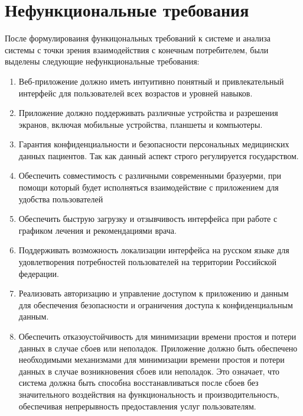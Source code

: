 \documentclass[14pt]{extreport}
\begin{document}
    \section{Нефункциональные требования}

        После формулироваиня функицональных требований к системе и анализа %
        системы с точки зрения взаимодействия с конечным потребителем, были выделены %
        следующие нефункциональные требования:
        \newline
        \begin{enumerate}
            \item Веб-приложение должно иметь интуитивно понятный и %
            привлекательный интерфейс для пользователей всех возрастов %
            и уровней навыков. 

            \item Приложение должно поддерживать различные устройства и %
            разрешения экранов, включая мобильные устройства, планшеты %
            и компьютеры. 

            \item Гарантия конфиденциальности и безопасности %
            персональных медицинских данных пациентов. Так как данный аспект %
            строго регулируется государством. 

            \item Обеспечить совместимость с различными современными бразуерми, %
            при помощи который будет исполняться взаимодействие с приложением для %
            удобства пользователей

            \item Обеспечить быструю загрузку и отзывчивость интерфейса %
            при работе с графиком лечения и рекомендациями врача.

            \item Поддерживать возможность локализации интерфейса на %
            русском языке для удовлетворения потребностей пользователей %
            на территории Российской федерации.

            \item Реализовать авторизацию и управление доступом к %
            приложению и данным для обеспечения безопасности и %
            ограничения доступа к конфиденциальным данным.

            \item Обеспечить отказоустойчивость для минимизации времени %
            простоя и потери данных в случае сбоев или неполадок. %
            Приложение должно быть обеспечено необходимыми механизмами %
            для минимизации времени простоя и потери данных в случае %
            возникновения сбоев или неполадок. Это означает, что %
            система должна быть способна восстанавливаться после %
            сбоев без значительного воздействия на функциональность и производительность, обеспечивая непрерывность предоставления услуг пользователям.
        \end{enumerate}
\end{document}
